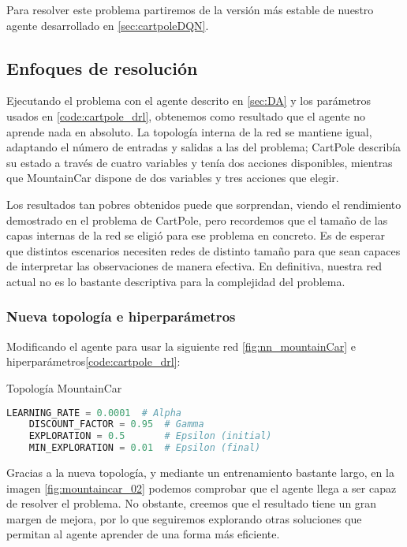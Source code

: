 Para resolver este problema partiremos de la versión más estable de nuestro agente desarrollado en \ref{sec:cartpoleDQN}.


\subsection{Enfoques de resolución}

Ejecutando el problema con el agente descrito en \ref{sec:DA} y los parámetros usados en \ref{code:cartpole_drl}, obtenemos como resultado que el agente no aprende nada en absoluto. La topología interna de la red se mantiene igual, adaptando el número de entradas y salidas a las del problema; CartPole describía su estado a través de cuatro variables y tenía dos acciones disponibles, mientras que MountainCar dispone de dos variables y tres acciones que elegir.

Los resultados tan pobres obtenidos puede que sorprendan, viendo el rendimiento demostrado en el problema de CartPole, pero recordemos que el tamaño de las capas internas de la red se eligió para ese problema en concreto. Es de esperar que distintos escenarios necesiten redes de distinto tamaño para que sean capaces de interpretar las observaciones de manera efectiva. En definitiva, nuestra red actual no es lo bastante descriptiva para la complejidad del problema.


\subsubsection{Nueva topología e hiperparámetros}

Modificando el agente para usar la siguiente red \ref{fig:nn_mountainCar} e hiperparámetros\ref{code:cartpole_drl}:

%
       {Topología MountainCar}

\begin{minipage}{0.9\linewidth}%
    \begin{lstlisting}[frame=tb, language=Python, caption=Hiperparámetros MountainCar, label=code:cartpole_drl]
    LEARNING_RATE = 0.0001  # Alpha
    DISCOUNT_FACTOR = 0.95  # Gamma
    EXPLORATION = 0.5       # Epsilon (initial)
    MIN_EXPLORATION = 0.01  # Epsilon (final)
    \end{lstlisting}%
\end{minipage}

Gracias a la nueva topología, y mediante un entrenamiento bastante largo, en la imagen \ref{fig:mountaincar_02} podemos comprobar que el agente llega a ser capaz de resolver el problema. No obstante, creemos que el resultado tiene un gran margen de mejora, por lo que seguiremos explorando otras soluciones que permitan al agente aprender de una forma más eficiente.


